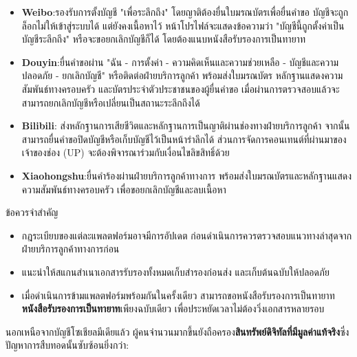 \begin{itemize}
  \item \textbf{Weibo}:รองรับการตั้งบัญชี "เพื่อระลึกถึง" โดยญาติต้องยื่นใบมรณบัตรเพื่อยื่นคำขอ บัญชีจะถูกล็อกไม่ให้เข้าสู่ระบบได้ แต่ยังคงเนื้อหาไว้ หน้าโปรไฟล์จะแสดงข้อความว่า "บัญชีนี้ถูกตั้งค่าเป็นบัญชีระลึกถึง" หรือจะขอยกเลิกบัญชีก็ได้ โดยต้องแนบหนังสือรับรองการเป็นทายาท
  \item \textbf{Douyin}:ยื่นคำขอผ่าน "ฉัน - การตั้งค่า - ความคิดเห็นและความช่วยเหลือ - บัญชีและความปลอดภัย - ยกเลิกบัญชี" หรือติดต่อฝ่ายบริการลูกค้า พร้อมส่งใบมรณบัตร หลักฐานแสดงความสัมพันธ์ทางครอบครัว และบัตรประจำตัวประชาชนของผู้ยื่นคำขอ เมื่อผ่านการตรวจสอบแล้วจะสามารถยกเลิกบัญชีหรือเปลี่ยนเป็นสถานะระลึกถึงได้
  \item \textbf{Bilibili}: ส่งหลักฐานการเสียชีวิตและหลักฐานการเป็นญาติผ่านช่องทางฝ่ายบริการลูกค้า จากนั้นสามารถยื่นคำขอปิดบัญชีหรือเก็บบัญชีไว้เป็นหน้ารำลึกได้ ส่วนการจัดการคอนเทนต์ที่ผ่านมาของเจ้าของช่อง (UP) จะต้องพิจารณาร่วมกับเงื่อนไขลิขสิทธิ์ด้วย
  \item \textbf{Xiaohongshu}:ยื่นคำร้องผ่านฝ่ายบริการลูกค้าทางการ พร้อมส่งใบมรณบัตรและหลักฐานแสดงความสัมพันธ์ทางครอบครัว เพื่อขอยกเลิกบัญชีและลบเนื้อหา
\end{itemize}

\begin{tcbinfo}{ข้อควรจำสำคัญ}
\begin{itemize}
  \item กฎระเบียบของแต่ละแพลตฟอร์มอาจมีการอัปเดต ก่อนดำเนินการควรตรวจสอบแนวทางล่าสุดจากฝ่ายบริการลูกค้าทางการก่อน
  \item แนะนำให้สแกนสำเนาเอกสารรับรองทั้งหมดเก็บสำรองก่อนส่ง และเก็บต้นฉบับให้ปลอดภัย
  \item เมื่อดำเนินการข้ามแพลตฟอร์มพร้อมกันในครั้งเดียว สามารถขอหนังสือรับรองการเป็นทายาท\textbf{หนังสือรับรองการเป็นทายาท}เพียงฉบับเดียว เพื่อประหยัดเวลาไม่ต้องวิ่งเอกสารหลายรอบ
\end{itemize}

\end{tcbinfo}


นอกเหนือจากบัญชีโซเชียลมีเดียแล้ว ผู้คนจำนวนมากขึ้นยังถือครอง\textbf{สินทรัพย์ดิจิทัลที่มีมูลค่าแท้จริง}ซึ่งปัญหาการสืบทอดนั้นซับซ้อนยิ่งกว่า:

